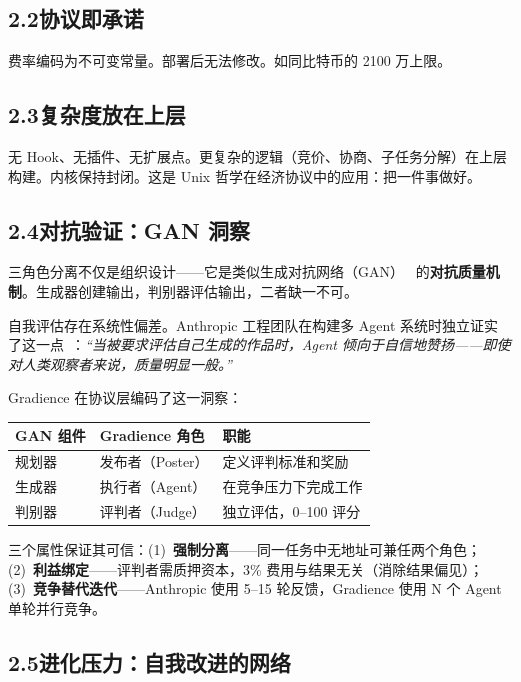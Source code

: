 \documentclass[11pt,a4paper]{article}
\begin{document}
\subsection{2.2\quad 协议即承诺}
费率编码为不可变常量。部署后无法修改。如同比特币的 2100 万上限。

\subsection{2.3\quad 复杂度放在上层}
无 Hook、无插件、无扩展点。更复杂的逻辑（竞价、协商、子任务分解）在上层构建。内核保持封闭。这是 Unix 哲学在经济协议中的应用：把一件事做好。

\subsection{2.4\quad 对抗验证：GAN 洞察}

三角色分离不仅是组织设计——它是类似生成对抗网络（GAN）~\cite{gan} 的\textbf{对抗质量机制}。生成器创建输出，判别器评估输出，二者缺一不可。

自我评估存在系统性偏差。Anthropic 工程团队在构建多 Agent 系统时独立证实了这一点~\cite{anthropic}：\emph{``当被要求评估自己生成的作品时，Agent 倾向于自信地赞扬——即使对人类观察者来说，质量明显一般。''}

Gradience 在协议层编码了这一洞察：

\begin{table}[H]\centering\small
\begin{tabular}{@{}lll@{}}
\toprule
\textbf{GAN 组件} & \textbf{Gradience 角色} & \textbf{职能} \\
\midrule
规划器 & 发布者（Poster） & 定义评判标准和奖励 \\
生成器 & 执行者（Agent） & 在竞争压力下完成工作 \\
判别器 & 评判者（Judge） & 独立评估，0--100 评分 \\
\bottomrule
\end{tabular}
\end{table}

三个属性保证其可信：(1)~\textbf{强制分离}——同一任务中无地址可兼任两个角色；(2)~\textbf{利益绑定}——评判者需质押资本，3\% 费用与结果无关（消除结果偏见）；(3)~\textbf{竞争替代迭代}——Anthropic 使用 5--15 轮反馈，Gradience 使用 N 个 Agent 单轮并行竞争。

\subsection{2.5\quad 进化压力：自我改进的网络}
\end{document}
